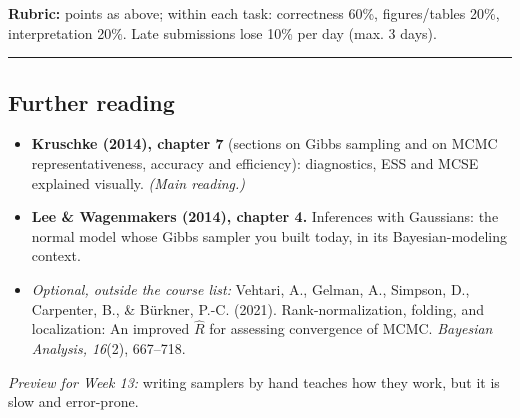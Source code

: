 \textbf{Rubric:} points as above; within each task: correctness 60\%,
figures/tables 20\%, interpretation 20\%. Late submissions lose 10\% per
day (max. 3 days).

\begin{center}\rule{0.5\linewidth}{0.5pt}\end{center}

\subsection{Further reading}

\begin{itemize}
\tightlist
\item
  \textbf{Kruschke (2014), chapter 7} (sections on Gibbs sampling and on
  MCMC representativeness, accuracy and efficiency): diagnostics, ESS
  and MCSE explained visually. \emph{(Main reading.)}
\item
  \textbf{Lee \& Wagenmakers (2014), chapter 4.} Inferences with
  Gaussians: the normal model whose Gibbs sampler you built today, in
  its Bayesian-modeling context.
\item
  \emph{Optional, outside the course list:} Vehtari, A., Gelman, A.,
  Simpson, D., Carpenter, B., \& Bürkner, P.-C. (2021).
  Rank-normalization, folding, and localization: An improved \(\hat R\)
  for assessing convergence of MCMC. \emph{Bayesian Analysis, 16}(2),
  667--718.
\end{itemize}

\emph{Preview for Week 13:} writing samplers by hand teaches how they
work, but it is slow and error-prone.
